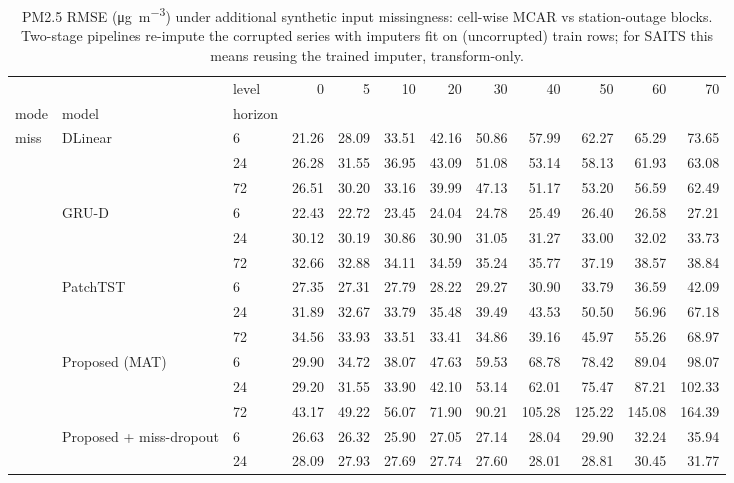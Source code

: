 \begin{table}
\caption{PM2.5 RMSE (\si{\micro\gram\per\cubic\metre}) under additional synthetic input missingness: cell-wise MCAR vs station-outage blocks. Two-stage pipelines re-impute the corrupted series with imputers fit on (uncorrupted) train rows; for SAITS this means reusing the trained imputer, transform-only.}
\label{tab:robustness}
\begin{tabular}{lllrrrrrrrrr}
\toprule
 &  & level & 0 & 5 & 10 & 20 & 30 & 40 & 50 & 60 & 70 \\
mode & model & horizon &  &  &  &  &  &  &  &  &  \\
\midrule
\multirow[t]{21}{*}{miss} & \multirow[t]{3}{*}{DLinear} & 6 & 21.26 & 28.09 & 33.51 & 42.16 & 50.86 & 57.99 & 62.27 & 65.29 & 73.65 \\
 &  & 24 & 26.28 & 31.55 & 36.95 & 43.09 & 51.08 & 53.14 & 58.13 & 61.93 & 63.08 \\
 &  & 72 & 26.51 & 30.20 & 33.16 & 39.99 & 47.13 & 51.17 & 53.20 & 56.59 & 62.49 \\
\cline{2-12}
 & \multirow[t]{3}{*}{GRU-D} & 6 & 22.43 & 22.72 & 23.45 & 24.04 & 24.78 & 25.49 & 26.40 & 26.58 & 27.21 \\
 &  & 24 & 30.12 & 30.19 & 30.86 & 30.90 & 31.05 & 31.27 & 33.00 & 32.02 & 33.73 \\
 &  & 72 & 32.66 & 32.88 & 34.11 & 34.59 & 35.24 & 35.77 & 37.19 & 38.57 & 38.84 \\
\cline{2-12}
 & \multirow[t]{3}{*}{PatchTST} & 6 & 27.35 & 27.31 & 27.79 & 28.22 & 29.27 & 30.90 & 33.79 & 36.59 & 42.09 \\
 &  & 24 & 31.89 & 32.67 & 33.79 & 35.48 & 39.49 & 43.53 & 50.50 & 56.96 & 67.18 \\
 &  & 72 & 34.56 & 33.93 & 33.51 & 33.41 & 34.86 & 39.16 & 45.97 & 55.26 & 68.97 \\
\cline{2-12}
 & \multirow[t]{3}{*}{Proposed (MAT)} & 6 & 29.90 & 34.72 & 38.07 & 47.63 & 59.53 & 68.78 & 78.42 & 89.04 & 98.07 \\
 &  & 24 & 29.20 & 31.55 & 33.90 & 42.10 & 53.14 & 62.01 & 75.47 & 87.21 & 102.33 \\
 &  & 72 & 43.17 & 49.22 & 56.07 & 71.90 & 90.21 & 105.28 & 125.22 & 145.08 & 164.39 \\
\cline{2-12}
 & \multirow[t]{3}{*}{Proposed + miss-dropout} & 6 & 26.63 & 26.32 & 25.90 & 27.05 & 27.14 & 28.04 & 29.90 & 32.24 & 35.94 \\
 &  & 24 & 28.09 & 27.93 & 27.69 & 27.74 & 27.60 & 28.01 & 28.81 & 30.45 & 31.77 \\

\end{tabular}
\end{table}
